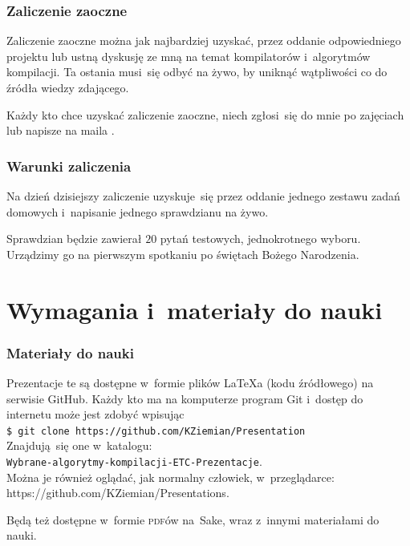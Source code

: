 \documentclass[10pt,t]{beamer}
\begin{document}
\begin{frame}
  \frametitle{Zaliczenie zaoczne}


  Zaliczenie zaoczne można jak najbardziej uzyskać, przez oddanie
  odpowiedniego projektu lub ustną dyskusję ze mną na temat kompilatorów
  i~algorytmów kompilacji. Ta ostania musi~się odbyć na żywo, by uniknąć
  wątpliwości co do źródła wiedzy zdającego.

  Każdy kto chce uzyskać zaliczenie zaoczne, niech zgłosi~się do mnie po
  zajęciach lub napisze na maila \email.

\end{frame}





\begin{frame}
  \frametitle{Warunki zaliczenia}


  Na dzień dzisiejszy zaliczenie uzyskuje~się przez oddanie jednego zestawu
  zadań domowych i~napisanie jednego sprawdzianu na żywo.

  Sprawdzian będzie zawierał $20$ pytań testowych, jednokrotnego wyboru.
  Urządzimy go na pierwszym spotkaniu po świętach Bożego Narodzenia.

\end{frame}









\section{Wymagania i~materiały do nauki}



\begin{frame}
  \frametitle{Materiały do nauki}


  Prezentacje te są dostępne w~formie plików \LaTeX a (kodu źródłowego)
  na serwisie GitHub. Każdy kto ma na komputerze program Git i~dostęp
  do internetu może jest zdobyć wpisując \\
  \texttt{\$ git clone https://github.com/KZiemian/Presentation} \\
  Znajdują~się one w~katalogu: \\
  \texttt{Wybrane-algorytmy-kompilacji-ETC-Prezentacje}. \\
  Można je również oglądać, jak normalny człowiek, w~przeglądarce: \\
  {https://github.com/KZiemian/Presentations}.

  Będą też dostępne w~formie \textsc{pdf}ów na~Sake, wraz z~innymi
  materiałami do nauki.

\end{frame}
\end{document}
